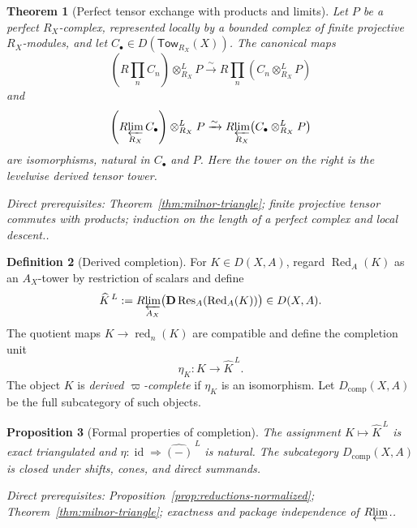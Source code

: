 \documentclass[10pt]{article}
\newtheorem{theorem}{Theorem}[section]
\newtheorem{proposition}[theorem]{Proposition}
\theoremstyle{definition}
\newtheorem{definition}[theorem]{Definition}
\newcommand{\Rlim}{R\!\varprojlim}
\newcommand{\Rprod}{R\!\prod}
\newcommand{\depends}[1]{\par\smallskip\noindent\textit{Direct prerequisites:} #1.}
\begin{document}
\begin{theorem}[Perfect tensor exchange with products and limits]
\label{thm:perfect-tensor-limit}
Let $P$ be a perfect $R_X$-complex, represented locally by a bounded complex
of finite projective $R_X$-modules, and let
$C_\bullet\in D(\mathsf{Tow}_{R_X}(X))$.  The canonical maps
\[
 \left(\Rprod_n C_n\right)\otimes^L_{R_X}P
 \xrightarrow{\sim}
 \Rprod_n(C_n\otimes^L_{R_X}P)
\]
and
\[
 \left(\Rlim_{R_X}C_\bullet\right)\otimes^L_{R_X}P
 \xrightarrow{\sim}
 \Rlim_{R_X}\bigl(C_\bullet\otimes^L_{R_X}P\bigr)
\]
are isomorphisms, natural in $C_\bullet$ and $P$.  Here the tower on the
right is the levelwise derived tensor tower.
\depends{Theorem~\ref{thm:milnor-triangle}; finite projective tensor
commutes with products; induction on the length of a perfect complex and
local descent.}
\end{theorem}

\begin{definition}[Derived completion]\label{def:derived-completion}
For $K\in D(X,A)$, regard $\operatorname{Red}_A(K)$ as an $A_X$-tower by
restriction of scalars and define
\[
 \widehat K^{\,L}:=
 \Rlim_{A_X}\bigl(\mathbf D\operatorname{Res}_A
       (\operatorname{Red}_A(K))\bigr)\in D(X,A).
\]
The quotient maps $K\to\operatorname{red}_n(K)$ are compatible and define
the completion unit
\[
 \eta_K:K\longrightarrow\widehat K^{\,L}.
\]
The object $K$ is \emph{derived $\varpi$-complete} if $\eta_K$ is an
isomorphism.  Let $D_{\mathrm{comp}}(X,A)$ be the full subcategory of such
objects.
\end{definition}

\begin{proposition}[Formal properties of completion]\label{prop:completion-formal}
The assignment $K\mapsto\widehat K^{\,L}$ is exact triangulated and
$\eta:\operatorname{id}\Rightarrow\widehat{(-)}^{\,L}$ is natural.  The
subcategory $D_{\mathrm{comp}}(X,A)$ is closed under shifts, cones, and
direct summands.
\depends{Proposition~\ref{prop:reductions-normalized};
Theorem~\ref{thm:milnor-triangle}; exactness and package independence of
$\Rlim$.}
\end{proposition}
\end{document}
